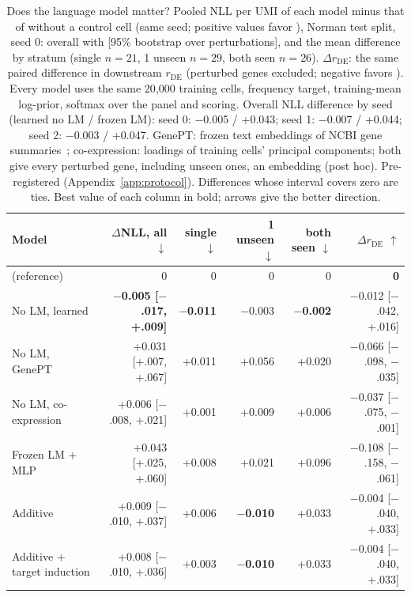 \begin{table}[t]
\centering
\setlength{\tabcolsep}{3pt}
\begin{tabular}{lrrrrr}
\toprule
Model & $\Delta$NLL, all $\downarrow$ & single $\downarrow$ & 1 unseen $\downarrow$ & both seen $\downarrow$ & $\Delta r_{\mathrm{DE}}$ $\uparrow$ \\
\midrule
\rowcolor{ours}\cad{} (reference) & 0 & 0 & 0 & 0 & \textbf{0} \\
No LM, learned & \textbf{$-$0.005 [$-$.017, +.009]} & \textbf{$-$0.011} & $-$0.003 & \textbf{$-$0.002} & $-$0.012 [$-$.042, +.016] \\
No LM, GenePT & +0.031 [+.007, +.067] & +0.011 & +0.056 & +0.020 & $-$0.066 [$-$.098, $-$.035] \\
No LM, co-expression & +0.006 [$-$.008, +.021] & +0.001 & +0.009 & +0.006 & $-$0.037 [$-$.075, $-$.001] \\
Frozen LM + MLP & +0.043 [+.025, +.060] & +0.008 & +0.021 & +0.096 & $-$0.108 [$-$.158, $-$.061] \\
Additive & +0.009 [$-$.010, +.037] & +0.006 & \textbf{$-$0.010} & +0.033 & $-$0.004 [$-$.040, +.033] \\
Additive + target induction & +0.008 [$-$.010, +.036] & +0.003 & \textbf{$-$0.010} & +0.033 & $-$0.004 [$-$.040, +.033] \\
\bottomrule
\end{tabular}
\caption{Does the language model matter? Pooled NLL per UMI of each model minus that of \cad{} without a control cell (same seed; positive values favor \cad{}), Norman test split, seed 0: overall with [95\% bootstrap over perturbations], and the mean difference by stratum (single $n=21$, 1 unseen $n=29$, both seen $n=26$). $\Delta r_{\mathrm{DE}}$: the same paired difference in downstream $r_{\mathrm{DE}}$ (perturbed genes excluded; negative favors \cad{}). Every model uses the same 20{,}000 training cells, frequency target, training-mean log-prior, softmax over the panel and scoring. Overall NLL difference by seed (learned no LM / frozen LM): seed 0: $-$0.005 / +0.043; seed 1: $-$0.007 / +0.044; seed 2: $-$0.003 / +0.047. GenePT: frozen text embeddings of NCBI gene summaries~\citep{chen2024genept}; co-expression: loadings of training cells' principal components; both give every perturbed gene, including unseen ones, an embedding (post hoc). Pre-registered (Appendix~\ref{app:protocol}). Differences whose interval covers zero are ties. Best value of each column in bold; arrows give the better direction.}
\label{tab:e1}
\end{table}
